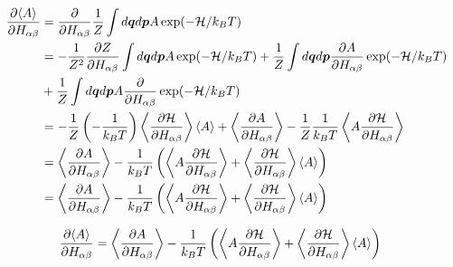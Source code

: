 \documentclass[11pt,a4paper,uplatex]{jsarticle}
\begin{document}
\begin{align}
    \frac{\partial \langle A \rangle }{\partial H_{\alpha \beta}} &= \frac{\partial}{\partial H_{\alpha \beta}}\frac{1}{Z} \int d\bm{q} d\bm{p} A \exp(-{\cal H}/k_{B} T) \\
    &= -\frac{1}{Z^{2}} \frac{\partial Z}{\partial H_{\alpha \beta}} \int d\bm{q} d\bm{p} A \exp(-{\cal H}/k_{B} T)  
    + \frac{1}{Z}\int d\bm{q} d\bm{p} \frac{\partial A}{\partial H_{\alpha \beta}} \exp(-{\cal H}/k_{B} T) \\ 
    &+ \frac{1}{Z}\int d\bm{q} d\bm{p} A \frac{\partial }{\partial H_{\alpha \beta}} \exp(-{\cal H}/k_{B} T) \\
    &= -\frac{1}{Z}\left(-\frac{1}{k_{B}T}\right) \left< {\frac{\partial \cal  H}{\partial H_{\alpha \beta}}}\right> \left< A \right> +\left< \frac{\partial A}{\partial H_{\alpha \beta}}  \right> - \frac{1}{Z}\frac{1}{k_{B} T} \left< A \frac{\partial {\cal H}}{\partial H_{\alpha \beta}} \right> \\
    &=\left< \frac{\partial A}{\partial H_{\alpha \beta}}  \right> -\frac{1}{k_{B}T} \left(\left< A \frac{\partial {\cal H}}{\partial H_{\alpha \beta}} \right>  + \left< \frac{\partial {\cal H}}{\partial H_{\alpha \beta}}\right> \left< A \right> \right) \\
    &= \left< \frac{\partial A}{\partial H_{\alpha \beta}}  \right> -\frac{1}{k_{B}T} \left(\left< A \frac{\partial {\cal H}}{\partial H_{\alpha \beta}} \right>  + \left< \frac{\partial {\cal H}}{\partial H_{\alpha \beta}}\right> \left< A \right> \right)
\end{align}

\begin{align}
    \frac{\partial \langle A \rangle }{\partial H_{\alpha \beta}} &= \left< \frac{\partial A}{\partial H_{\alpha \beta}}  \right> -\frac{1}{k_{B}T} \left(\left< A \frac{\partial {\cal H}}{\partial H_{\alpha \beta}} \right>  + \left< \frac{\partial {\cal H}}{\partial H_{\alpha \beta}}\right> \left< A \right> \right)
\end{align}
\end{document}
